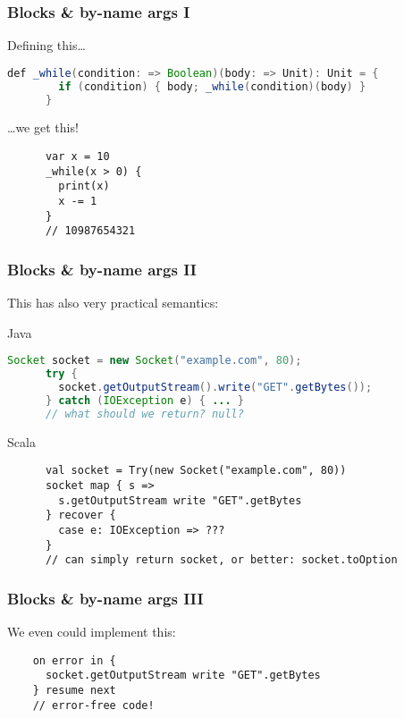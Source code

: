 \documentclass{beamer}
\begin{document}
\begin{frame}[containsverbatim]
  \lstset{gobble=6}
  \frametitle{Blocks \& by-name args I}
  \begin{block}{Defining this\ldots}
    \begin{lstlisting}[language=Java]
      def _while(condition: => Boolean)(body: => Unit): Unit = {
        if (condition) { body; _while(condition)(body) }
      }
    \end{lstlisting}
  \end{block}
  \begin{block}{\ldots we get this!}
    \begin{lstlisting}
      var x = 10
      _while(x > 0) {
        print(x)
        x -= 1
      }
      // 10987654321
    \end{lstlisting}
  \end{block}
\end{frame}

\begin{frame}[containsverbatim]
  \lstset{gobble=6}
  \frametitle{Blocks \& by-name args II}
  This has also very practical semantics:
  \begin{block}{Java}
    \begin{lstlisting}[language=Java]
      Socket socket = new Socket("example.com", 80);
      try { 
        socket.getOutputStream().write("GET".getBytes());
      } catch (IOException e) { ... }
      // what should we return? null?
    \end{lstlisting}
  \end{block}
  \begin{block}{Scala}
    \begin{lstlisting}
      val socket = Try(new Socket("example.com", 80))
      socket map { s => 
        s.getOutputStream write "GET".getBytes
      } recover { 
        case e: IOException => ??? 
      }
      // can simply return socket, or better: socket.toOption
    \end{lstlisting}
  \end{block}
\end{frame}

\begin{frame}[containsverbatim]
  \lstset{gobble=4}
  \frametitle{Blocks \& by-name args III}
  We even could implement this:
  \begin{lstlisting}
    on error in {
      socket.getOutputStream write "GET".getBytes
    } resume next
    // error-free code!
  \end{lstlisting}
\end{frame}
\end{document}
